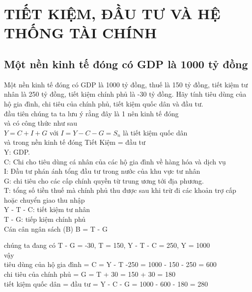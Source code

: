 \documentclass{report}
\begin{document}
\setcounter{chapter}{7}
\chapter{TIẾT KIỆM, ĐẦU TƯ VÀ 
HỆ THỐNG TÀI CHÍNH}

\setcounter{section}{1}
\section{Một nền kinh tế đóng có GDP là 1000 tỷ đồng}
Một nền kinh tế đóng có GDP là 1000 tỷ đồng, thuế là 150 tỷ đồng, tiết kiệm tư 
nhân là 250 tỷ đồng, tiết kiệm chính phủ là -30 tỷ đồng. Hãy tính tiêu dùng của hộ gia 
đình, chi tiêu của chính phủ, tiết kiệm quốc dân và đầu tư.\\
đầu tiên chúng ta ta lưu ý rằng đây là 1 nên kinh tế đóng \\
và có công thức như sau\\
$Y = C + I + G$ với $I = Y - C - G = S_n $ là tiết kiệm quốc dân\\
và trong nền kinh tế đóng Tiết Kiệm = đầu tư\\
Y: GDP. \\
C: Chi cho tiêu dùng cá nhân của các hộ gia đình về hàng hóa và dịch vụ \\
I: Đầu tư phán ánh tổng đầu tư trong nước của khu vực tư nhân \\
G: chi tiêu cho các cấp chính quyền từ trung ương tới địa phương.\\
T:  tổng số tiền thuế mà chính phủ thu được sau 
khi trừ đi các khoản trợ cấp hoặc chuyển giao thu nhập \\
Y - T - C: tiết kiệm tư nhân\\
T - G: tiếp kiệm chính phủ\\
Cán cân ngân sách (B) B = T - G

chúng ta đang có T - G = -30, T = 150, Y - T - C = 250, Y = 1000\\
vậy \\
tiêu dùng của hộ gia đình = C = Y - T -250 = 1000 - 150 - 250 = 600\\
chi tiêu của chính phủ = G = T + 30 = 150 + 30 = 180\\
tiết kiệm quốc dân = đầu tư = Y - C - G = 1000 - 600  - 180 = 280
\end{document}
